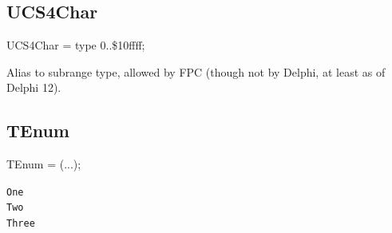 \documentclass{report}
\begin{document}
\subsection*{UCS4Char}
\begin{list}{}{
\setlength{\itemindent}{0cm}
\setlength{\listparindent}{0cm}
\setlength{\leftmargin}{\evensidemargin}
\addtolength{\leftmargin}{\tmplength}
\settowidth{\labelsep}{X}
\addtolength{\leftmargin}{\labelsep}
\setlength{\labelwidth}{\tmplength}
}
\begin{flushleft}
\item[\textbf{Declaration}\hfill]
\begin{ttfamily}
UCS4Char = type 0..{\$}10ffff;\end{ttfamily}


\end{flushleft}
\par
\item[\textbf{Description}]
Alias to subrange type, allowed by FPC (though not by Delphi, at least as of Delphi 12).

\end{list}
\subsection*{TEnum}
\begin{list}{}{
\setlength{\itemindent}{0cm}
\setlength{\listparindent}{0cm}
\setlength{\leftmargin}{\evensidemargin}
\addtolength{\leftmargin}{\tmplength}
\settowidth{\labelsep}{X}
\addtolength{\leftmargin}{\labelsep}
\setlength{\labelwidth}{\tmplength}
}
\begin{flushleft}
\item[\textbf{Declaration}\hfill]
\begin{ttfamily}
TEnum = (...);\end{ttfamily}


\end{flushleft}
\par
\item[\textbf{Description}]
 \item[\textbf{Values}]
\begin{description}
\item[\texttt{One}]  
\item[\texttt{Two}]  
\item[\texttt{Three}]  
\end{description}


\end{list}
\end{document}
